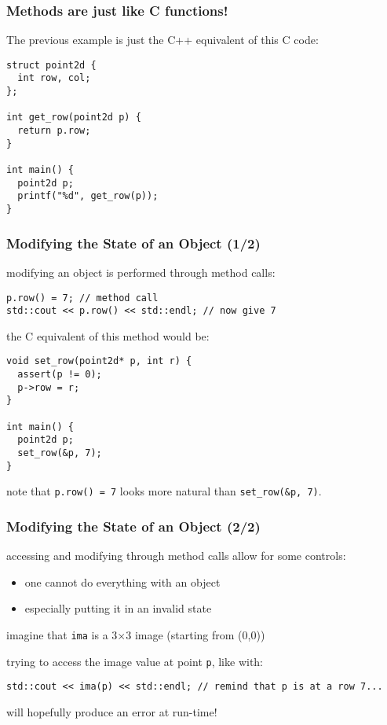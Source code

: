 \documentclass{beamer}
\newcommand{\cpp}{{C++}\xspace}
\newcommand{\code}[1]{{\scriptsize{\texttt{#1}}}\xspace}
\newcommand{\var}[1]{\texttt{#1}\xspace}
\begin{document}
\begin{frame}[fragile]
  \frametitle{Methods are just like C functions!}

The previous example is just the \cpp equivalent of this C code:

\begin{lstlisting}
struct point2d {
  int row, col;
};

int get_row(point2d p) {
  return p.row;
}

int main() {
  point2d p;
  printf("%d", get_row(p));
}
\end{lstlisting}

\end{frame}



\begin{frame}[fragile]
  \frametitle{Modifying the State of an Object (1/2)}

modifying an object is performed through method calls:

\begin{lstlisting}
p.row() = 7; // method call
std::cout << p.row() << std::endl; // now give 7
\end{lstlisting} %

\smallskip

the C equivalent of this method would be:
\begin{lstlisting}
void set_row(point2d* p, int r) {
  assert(p != 0);
  p->row = r;
}

int main() {
  point2d p;
  set_row(&p, 7);
}
\end{lstlisting}

note that \code{p.row() = 7} looks more natural than \code{set\_row(\&p, 7)}.

\end{frame}


\begin{frame}[fragile]
  \frametitle{Modifying the State of an Object (2/2)}

  accessing and modifying through method calls allow for some controls:
  \begin{itemize}
  \item one cannot do everything with an object
  \item especially putting it in an invalid state
  \end{itemize}

  \smallskip

imagine that \var{ima} is a 3$\times$3 image (starting from (0,0))

trying to access the image value at point \var{p}, like with:
\begin{lstlisting}
std::cout << ima(p) << std::endl; // remind that p is at a row 7...
\end{lstlisting} %
will hopefully produce an error at run-time!

\end{frame}
\end{document}
